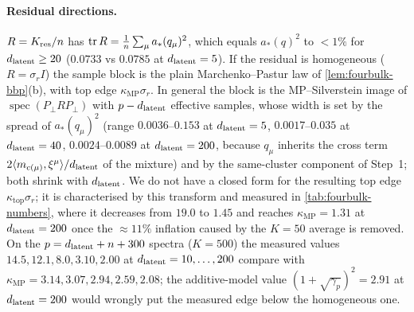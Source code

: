 \paragraph{Residual directions.}
$R=K_{\mathrm{res}}/n$ has $\operatorname{tr}R=\tfrac1{n}\sum_\mu a_*(q_\mu)^2$, which equals $a_*(q)^2$ to $<1\%$ for $d_{\mathrm{latent}}\ge20$ ($0.0733$ vs $0.0785$ at $d_{\mathrm{latent}}=5$). If the residual is homogeneous ($R=\sigma_rI$) the sample block is the plain Marchenko--Pastur law of \cref{lem:fourbulk-bbp}(b), with top edge $\kappa_{\mathrm{MP}}\sigma_r$. In general the block is the MP--Silverstein image of $\operatorname{spec}(P_\perp RP_\perp)$ with $p-d_{\mathrm{latent}}$ effective samples, whose width is set by the spread of $a_*(q_\mu)^2$ (range $0.0036$--$0.153$ at $d_{\mathrm{latent}}=5$, $0.0017$--$0.035$ at $d_{\mathrm{latent}}=40$, $0.0024$--$0.0089$ at $d_{\mathrm{latent}}=200$, because $q_\mu$ inherits the cross term $2\langle m_{c(\mu)},\xi^\mu\rangle/d_{\mathrm{latent}}$ of the mixture) and by the same-cluster component of Step~1; both shrink with $d_{\mathrm{latent}}$. We do not have a closed form for the resulting top edge $\kappa_{\mathrm{top}}\sigma_r$; it is characterised by this transform and measured in \cref{tab:fourbulk-numbers}, where it decreases from $19.0$ to $1.45$ and reaches $\kappa_{\mathrm{MP}}=1.31$ at $d_{\mathrm{latent}}=200$ once the $\approx11\%$ inflation caused by the $K=50$ average is removed. On the $p=d_{\mathrm{latent}}+n+300$ spectra ($K=500$) the measured values $14.5,12.1,8.0,3.10,2.00$ at $d_{\mathrm{latent}}=10,\dots,200$ compare with $\kappa_{\mathrm{MP}}=3.14,3.07,2.94,2.59,2.08$; the additive-model value $(1+\sqrt{\gamma_p})^2=2.91$ at $d_{\mathrm{latent}}=200$ would wrongly put the measured edge below the homogeneous one.

